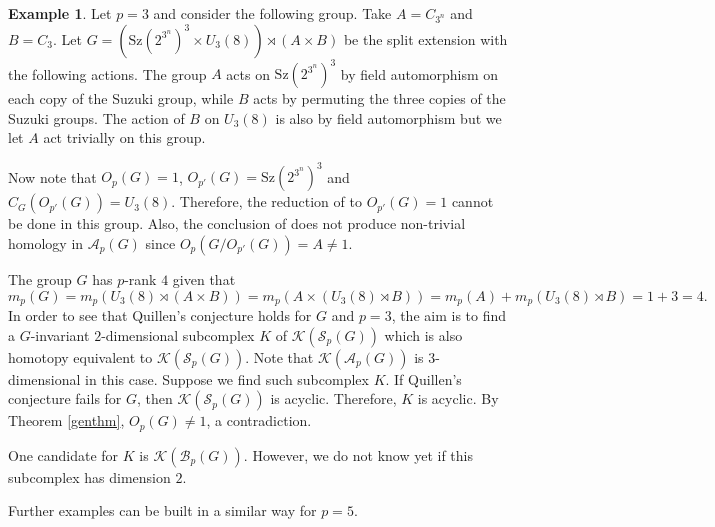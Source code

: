\documentclass[11pt,twoside,reqno]{amsart}
\theoremstyle{plain}
\theoremstyle{definition}
\newtheorem{example}[theorem]{Example}
\theoremstyle{remark}
\def\A{\mathcal{A}}
\def\B{{\mathcal B}}
\def\K{\mathcal{K}}
\def\S{\mathcal{S}}
\def\Sz{\mathrm{Sz}}
\begin{document}
\begin{example}\label{example3Prank4}
Let $p = 3$ and consider the following group.
Take $A = C_{3^n}$ and $B = C_3$.
Let $G=(\Sz(2^{3^n})^3 \times U_3(8))\rtimes (A\times B)$ be the split extension with the following actions.
The group $A$ acts on $\Sz(2^{3^n})^3$ by field automorphism on each copy of the Suzuki group, while $B$ acts by permuting the three copies of the Suzuki groups.
The action of $B$ on $U_3(8)$ is also by field automorphism but we let $A$ act trivially on this group.

Now note that $O_p(G) = 1$, $O_{p'}(G) = \Sz(2^{3^n})^3$ and $C_G(O_{p'}(G)) = U_3(8)$.
Therefore, the reduction of \cite{AschbacherSmith} to $O_{p'}(G) = 1$ cannot be done in this group.
Also, the conclusion of \cite[Lemma 0.12]{AschbacherSmith} does not produce non-trivial homology in $\A_p(G)$ since $O_p(G / O_{p'}(G)) = A \neq 1$.

The group $G$ has $p$-rank $4$ given that
\[m_p(G) = m_p(U_3(8) \rtimes (A\times B)) = m_p(A\times (U_3(8)\rtimes B)) = m_p(A) + m_p(U_3(8) \rtimes B) = 1 + 3 = 4.\]
In order to see that Quillen's conjecture holds for $G$ and $p = 3$, the aim is to find a $G$-invariant $2$-dimensional subcomplex $K$ of $\K(\S_p(G))$ which is also homotopy equivalent to $\K(\S_p(G))$.
Note that $\K(\A_p(G))$ is $3$-dimensional in this case.
Suppose we find such subcomplex $K$.
If Quillen's conjecture fails for $G$, then $\K(\S_p(G))$ is acyclic.
Therefore, $K$ is acyclic.
By Theorem \ref{genthm}, $O_p(G) \neq 1$, a contradiction.

One candidate for $K$ is $\K(\B_p(G))$. However, we do not know yet if this subcomplex has dimension $2$.
\end{example}



Further examples can be built in a similar way for $p = 5$.
\end{document}
